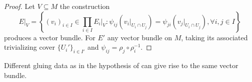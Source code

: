 \begin{proof}
    Let $V\subseteq M$ the construction
    $$E|_{V}=\left\{(v_{i})_{i\in I}\in\prod_{i\in I}E_{i}|_{V}:\psi_{ij}(v_{i}|_{U_{i}\cap U_{j}})=\psi_{ji}(v_{j}|_{U_{i}\cap U_{j}}), \forall i,j\in I\right\}$$
    produces a vector bundle. For $E'$ any vector bundle on $M$, taking its associated trivializing cover $\{U_{i}'\}_{i\in I'}$ and $\psi_{ij}=\rho_{j}\circ\rho_{i}^{-1}$.  
\end{proof}
\begin{remark}
    Different gluing data as in the hypothesis of  can give rise to the same vector bundle. 
\end{remark}